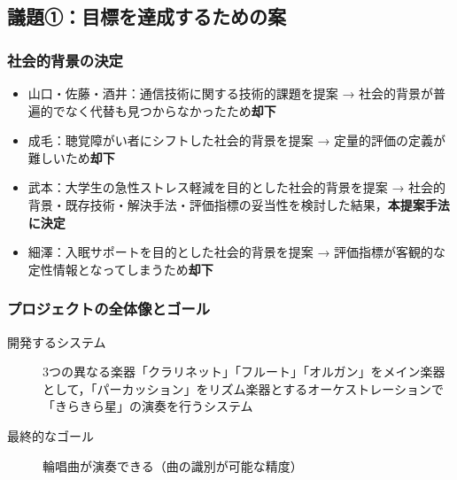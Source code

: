 \documentclass[a4paper,12pt]{ltjsarticle}
\begin{document}
\subsection*{議題①：目標を達成するための案}

\subsubsection*{社会的背景の決定}
\begin{itemize}
  \item 山口・佐藤・酒井：通信技術に関する技術的課題を提案 → 社会的背景が普遍的でなく代替も見つからなかったため\textbf{却下}
  \item 成毛：聴覚障がい者にシフトした社会的背景を提案 → 定量的評価の定義が難しいため\textbf{却下}
  \item 武本：大学生の急性ストレス軽減を目的とした社会的背景を提案 → 社会的背景・既存技術・解決手法・評価指標の妥当性を検討した結果，\textbf{本提案手法に決定}
  \item 細澤：入眠サポートを目的とした社会的背景を提案 → 評価指標が客観的な定性情報となってしまうため\textbf{却下}
\end{itemize}

\subsubsection*{プロジェクトの全体像とゴール}
\begin{description}
  \item[開発するシステム]
    3つの異なる楽器「クラリネット」「フルート」「オルガン」をメイン楽器として，「パーカッション」をリズム楽器とするオーケストレーションで「きらきら星」の演奏を行うシステム
  \item[最終的なゴール]
    輪唱曲が演奏できる（曲の識別が可能な精度）
\end{description}
\end{document}
